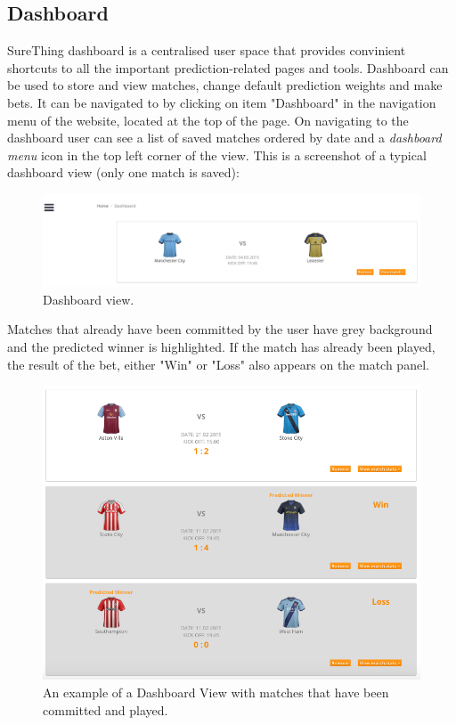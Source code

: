 \subsection{Dashboard}
\label{subsec:dashboard}
SureThing dashboard is a centralised user space that provides convinient shortcuts to all the important prediction-related pages and tools. Dashboard can be used to store and view matches, change default prediction weights and make bets. It can be navigated to by clicking on item "Dashboard" in the navigation menu of the website, located at the top of the page. On navigating to the dashboard user can see a list of saved matches ordered by date and a \emph{dashboard menu} icon in the top left corner of the view. This is a screenshot of a typical dashboard view (only one match is saved):

\begin{figure}[H]
	\begin{center}
		\includegraphics[width=.90\linewidth,natwidth=610,natheight=642]{impl/images/typicalDashboard}
		\caption{Dashboard view.} \label{fig:typicaldashboard}
	\end{center}
\end{figure}

Matches that already have been committed by the user have grey background and the predicted winner is highlighted. If the match has already been played, the result of the bet, either "Win" or "Loss" also appears on the match panel.

\begin{figure}[H]
	\begin{center}
		\includegraphics[width=.90\linewidth,natwidth=610,natheight=642]{impl/images/dashboardCommittedMatches}
		\caption{An example of a Dashboard View with matches that have been committed and played.} \label{fig:dashboardcommittedmatches}
	\end{center}
\end{figure}

